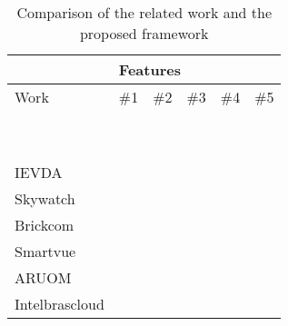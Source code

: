 \begin{table}[h!]
\centering
\caption{Comparison of the related work and the proposed framework}
\label{Comparison of the related work and the proposed framework}
\begin{tabular}{|l|l|l|l|l|l|}
\hline
\rowcolor[HTML]{C0C0C0} 
                             & \multicolumn{5}{l|}{\cellcolor[HTML]{C0C0C0}Features}                 \\ \hline
\rowcolor[HTML]{C0C0C0} 
Work                         & \#1 & \#2                      & \#3 & \#4 						& \#5                      \\ \hline
\cite{Rodriguez2012}     &     &                          &     &     						& \cellcolor[HTML]{C0C0C0} \\ \hline
\cite{salmane2015}      &     &                          &     &     						& \cellcolor[HTML]{C0C0C0} \\ \hline
\cite{dey2012smart}  &     &                          &     &     						& \cellcolor[HTML]{C0C0C0} \\ \hline
\cite{FANG2013}       &     & \cellcolor[HTML]{C0C0C0} &     &     						& \cellcolor[HTML]{C0C0C0} \\ \hline
\cite{Xiang2013}      &     &                          &     &     						& \cellcolor[HTML]{C0C0C0} \\ \hline
\cite{Sunehra2014} &     &                          &     &     						& \cellcolor[HTML]{C0C0C0} \\ \hline
\cite{Paul2013}    &     & \cellcolor[HTML]{C0C0C0} &     &     						&                          \\ \hline
\cite{Wen2010}       &     &                          &     &     						& \cellcolor[HTML]{C0C0C0} \\ \hline
\cite{Yang2015}      &     & \cellcolor[HTML]{C0C0C0} &     &     						& 						   \\ \hline
IEVDA				         &     & 						  &     &     						& \cellcolor[HTML]{C0C0C0} \\ \hline
Skywatch			         &     & 						  &     & \cellcolor[HTML]{C0C0C0}  & \cellcolor[HTML]{C0C0C0} \\ \hline
Brickcom			         &     & 						  &     &     						& \cellcolor[HTML]{C0C0C0} \\ \hline
Smartvue			         &     & 						  &     & \cellcolor[HTML]{C0C0C0}  & \cellcolor[HTML]{C0C0C0} \\ \hline
ARUOM	 &      &  &      &      						&\cellcolor[HTML]{C0C0C0}                          \\ \hline
Intelbrascloud	 &      &  &      &      						&\cellcolor[HTML]{C0C0C0}                          \\ \hline


\end{tabular}
\end{table}

